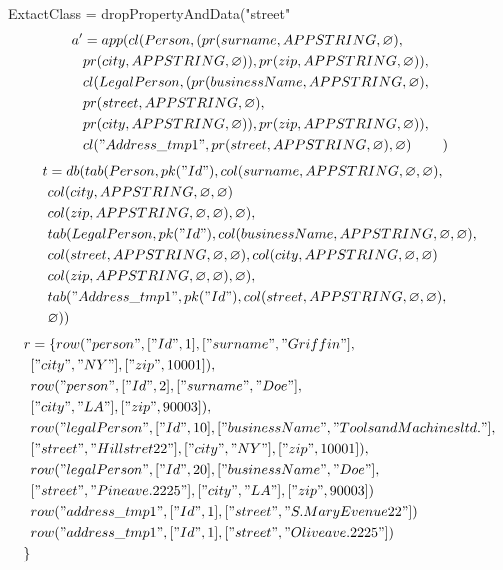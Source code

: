 \documentclass[11pt]{article}
\begin{document}
\newpage
ExtactClass = dropPropertyAndData("street"
\begin{align*}
a' &= app(cl(Person, (pr(surname, APPSTRING, \varnothing), \\
& pr(city, APPSTRING, \varnothing)), pr(zip, APPSTRING, \varnothing)), \\
& cl(LegalPerson, (pr(businessName, APPSTRING, \varnothing), \\
& pr(street, APPSTRING, \varnothing), \\
& pr(city, APPSTRING, \varnothing)), pr(zip, APPSTRING, \varnothing)), \\
& cl("Address\_tmp1", pr(street, APPSTRING, \varnothing) , \varnothing)
& )
\end{align*}
\begin{align*}
t &= db(tab(Person, pk("Id"), col(surname, APPSTRING, \varnothing, \varnothing), \\
& col(city, APPSTRING, \varnothing, \varnothing) \\
& col(zip, APPSTRING, \varnothing, \varnothing), \varnothing), \\
& tab(LegalPerson, pk("Id"),  col(businessName, APPSTRING, \varnothing, \varnothing), \\
& col(street, APPSTRING, \varnothing, \varnothing), col(city, APPSTRING, \varnothing, \varnothing) \\
& col(zip, APPSTRING, \varnothing, \varnothing), \varnothing), \\
& tab("Address\_tmp1", pk("Id"), col(street, APPSTRING, \varnothing, \varnothing),\\
& \varnothing)) 
\end{align*}
\begin{align*}
r &= \{ row("person", ["Id", 1], ["surname", "Griffin"], \\
& ["city", "NY"], ["zip", 10001]), \\
& row("person", ["Id", 2], ["surname", "Doe"], \\
& ["city", "LA"], ["zip", 90003]), \\
& row("legalPerson", ["Id", 10], ["businessName", "Tools and Machines ltd."], \\
& ["street", "Hill stret 22"], ["city", "NY"], ["zip", 10001]), \\
& row("legalPerson", ["Id", 20], ["businessName", "Doe"], \\
& ["street", "Pine ave. 2225"], ["city", "LA"], ["zip", 90003])\\
& row("address\_tmp1", ["Id", 1], ["street", "S. Mary Evenue 22"]) \\
& row("address\_tmp1", ["Id", 1], ["street", "Olive ave. 2225"] )\\
\}
\end{align*}
\end{document}
